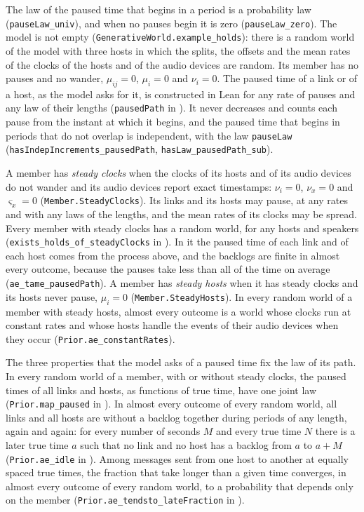\documentclass[11pt,a4paper]{article}
\newcommand{\lean}[1]{\texttt{#1}}
\theoremstyle{definition}
\begin{document}
The law of the paused time that begins in a period is a probability law
(\lean{pauseLaw\_univ}), and when no pauses begin it is zero
(\lean{pauseLaw\_zero}). The model is not empty
(\lean{GenerativeWorld.\allowbreak example\_\allowbreak holds}): there is a
random world of the model with three hosts in which the splits, the offsets
and the mean rates of the clocks of the hosts and of the audio devices are
random. Its member has no pauses and no
wander, $\mu_{ij} = 0$, $\mu_i = 0$ and $\nu_i = 0$. The paused time of a
link or of a host, as the model asks for it, is constructed in Lean for any
rate of pauses and any law of their lengths (\lean{pausedPath} in
). It never decreases and
counts each pause from the instant at which it begins, and the paused time
that begins in periods that do not overlap is independent, with the law
\lean{pauseLaw}
(\lean{hasIndepIncrements\_\allowbreak pausedPath},
\lean{hasLaw\_\allowbreak pausedPath\_\allowbreak sub}).

A member has \emph{steady clocks} when the clocks of its hosts and of its
audio devices do not wander and its audio devices report exact timestamps:
$\nu_i = 0$, $\nu_x = 0$ and $\varsigma_x = 0$ (\lean{Member.SteadyClocks}).
Its links and its hosts may pause, at any rates and with any laws of the
lengths, and the mean rates of its clocks may be spread. Every member with
steady clocks has a random world, for any hosts and speakers
(\lean{exists\_\allowbreak holds\_\allowbreak of\_\allowbreak steadyClocks}
in ). In it the paused
time of each link and of each host comes from the process above, and the
backlogs are finite in almost every outcome, because the pauses take less
than all of the time on average
(\lean{ae\_\allowbreak tame\_\allowbreak pausedPath}). A member has
\emph{steady hosts} when it has steady clocks and its hosts never pause,
$\mu_i = 0$ (\lean{Member.SteadyHosts}). In every random world of a member
with steady hosts, almost every outcome is a world whose clocks run at
constant rates and whose hosts handle the events of their audio devices
when they occur (\lean{Prior.ae\_\allowbreak constantRates}).

The three properties that the model asks of a paused time fix the law of its
path. In every random world of a member, with or without steady clocks, the
paused times of all links and hosts, as functions of true time, have one
joint law (\lean{Prior.map\_\allowbreak paused} in
). In almost every
outcome of every random world, all links and all hosts are without a backlog
together during periods of any length, again and again: for every number of
seconds $M$ and every true time $N$ there is a later true time $a$ such
that no link and no host has a backlog from $a$ to $a + M$
(\lean{Prior.ae\_\allowbreak idle} in
). Among messages sent
from one host to another at equally spaced true times, the fraction that take
longer than a given time converges, in almost every outcome of every random
world, to a probability that depends only on the member
(\lean{Prior.ae\_\allowbreak tendsto\_\allowbreak lateFraction} in
).
\end{document}
